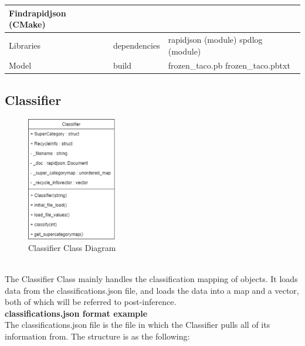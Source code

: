 \documentclass[conference]{IEEEtran}
\begin{document}
\begin{table}[htbp!]
\begin{center}
\begin{tabular}{|p{1.5cm}|p{2.2cm}|p{3.9cm}|}
\newline
\newline
Findrapidjson (CMake)
\newline
\\ \hline
Libraries & dependencies & rapidjson (module)
\newline
\newline
spdlog (module)
\newline
\\ \hline
Model & build &
frozen\_taco.pb
\newline
frozen\_taco.pbtxt
\newline
\\ \hline
\end{tabular}
\label{tab1}
\end{center}
\end{table}


\subsection{Classifier}

\begin{figure}[h]
    \centering
    \includegraphics[width=0.35\textwidth]{images/code_diagrams/classifier_uml.eps}
    \caption{Classifier Class Diagram}
\end{figure}~\\

The Classifier Class mainly handles the classification mapping of objects. It loads data from the classifications.json file, and loads the data into a map and a vector, both of which will be referred to post-inference.\\


\textbf{classifications.json format example}~\\

The classifications.json file is the file in which the Classifier pulls all of its information from. The structure is as the following:
\end{document}
